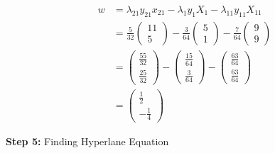 \documentclass[12pt]{report}
\begin{document}
\begin{equation}
	\begin{aligned}
		w & = \lambda_{21}y_{21}x_{21} - \lambda_{1}y_{1}X_{1} - \lambda_{11}y_{11}X_{11}                                                                                                                                            \\
		  & = \frac{5}{32}\begin{pmatrix}11                                         \\ 5\end{pmatrix}-\frac{3}{64}\begin{pmatrix}5\\ 1\end{pmatrix}-\frac{7}{64}\begin{pmatrix}9\\ 9\end{pmatrix}                                    \\
		  & = \begin{pmatrix}\frac{55}{32}                                          \\ \frac{25}{32}\end{pmatrix}-\begin{pmatrix}\frac{15}{64}\\ \frac{3}{64}\end{pmatrix}-\begin{pmatrix}\frac{63}{64}\\ \frac{63}{64}\end{pmatrix} \\
		  & = \begin{pmatrix}\frac{1}{2}                                            \\ -\frac{1}{4}\end{pmatrix}
	\end{aligned}
\end{equation}

\vspace{20pt}

\textbf{Step 5:} Finding Hyperlane Equation
\end{document}
